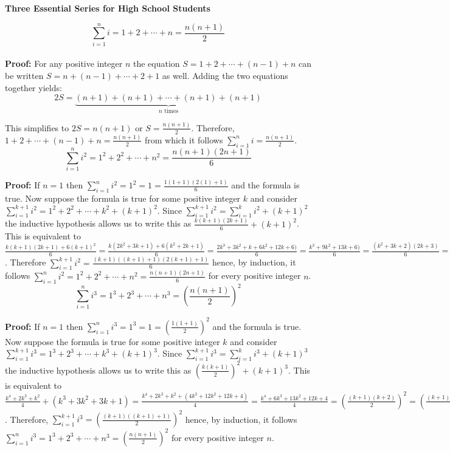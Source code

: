 \documentclass[12pt]{article}
\begin{document}
\begin{center}
\textbf{{\Large Three Essential Series for High School Students}}
\end{center}
\[\sum_{i=1}^{n}i=1+2+\cdots+n=\frac{n(n+1)}{2}\]\\
\textbf{Proof:} For any positive integer $n$ the equation $S=1+2+ \cdots +(n-1)+n$ can be written 
$S=n+(n-1)+\cdots+2+1$ as well. Adding the two equations together yields:
\[2S=\underbrace{(n+1)+(n+1)+\cdots+(n+1)+(n+1)}_\text{$n$ times}\]

This simplifies to $2S=n(n+1)$ or $S=\frac{n(n+1)}{2}$. Therefore,
$1+2+\cdots+(n-1)+n=\frac{n(n+1)}{2}$ from which it
follows $\sum_{i=1}^{n}i=\frac{n(n+1)}{2}$.\\

\[\sum_{i=1}^{n}i^2=1^2+2^2+\cdots + n^2=
\frac{n(n+1)(2n+1)}{6}\]

\noindent\textbf{Proof:} If $n=1$ then $\sum_{i=1}^{n}i^2=1^2=1=\frac{1(1+1)(2(1)+1)}{6}$ and the formula
is true. Now suppose the formula is true for some positive
integer $k$ and consider $\sum_{i=1}^{k+1}i^2=1^2+2^2+\cdots + k^2+(k+1)^2$. Since $\sum_{i=1}^{k+1}i^2=
\sum_{i=1}^{k}i^2+(k+1)^2$ the inductive hypothesis 
allows us to write this as $\frac{k(k+1)(2k+1)}{6}+(k+1)^2$.
This is equivalent to $\frac{k(k+1)(2k+1)+6(k+1)^2}{6}=
\frac{k(2k^2+3k+1)+6(k^2+2k+1)}{6}=
\frac{2k^3+3k^2+k+6k^2+12k+6)}{6}=
\frac{k^3+9k^2+13k+6)}{6} = 
\frac{(k^2+3k+2)(2k+3)}{6}=
\frac{(k+1)(k+2)(2(k+1)+1)}{6}$. Therefore $\sum_{i=1}^{k+1}i^2=\frac{(k+1)((k+1)+1)(2(k+1)+1)}{6}$
hence, by induction, it
follows $\sum_{i=1}^{n}i^2=1^2+2^2+
\cdots + n^2=\frac{n(n+1)(2n+1)}{6}$ for every 
positive integer $n$.\\

\[\sum_{i=1}^{n}i^3=1^3+2^3+\cdots + n^3=
\left(\frac{n(n+1)}{2}\right)^2\]

\noindent\textbf{Proof:} If $n=1$ then $\sum_{i=1}^{n}i^3=1^3=1=\left(\frac{1(1+1)}{2}\right)^2$ and 
the formula is true. Now suppose the formula is true for some 
positive integer $k$ and consider $\sum_{i=1}^{k+1}i^3=1^3+2^3+\cdots + k^3+(k+1)^3$. Since 
$\sum_{i=1}^{k+1}i^3=\sum_{i=1}^{k}i^3+(k+1)^3$
the inductive hypothesis allows us to write this as 
$\left(\frac{k(k+1)}{2}\right)^2+(k+1)^3$.
This is equivalent to $\frac{k^4+2k^3+k^2}{4}
+(k^3+3k^2+3k+1)=
\frac{k^4+2k^3+k^2+(4k^3+12k^2+12k+4)}{4}=
\frac{k^4+6k^3+13k^2+12k+4}{4}=
\left(\frac{(k+1)(k+2)}{2}\right)^2=
\left(\frac{(k+1)((k+1)+1)}{2}\right)^2$. Therefore,
$\sum_{i=1}^{k+1}i^3=\left(\frac{(k+1)((k+1)+1)}{2}\right)^2$ hence, by induction, it follows 
$\sum_{i=1}^{n}i^3=1^3+2^3+\cdots + n^3=
\left(\frac{n(n+1)}{2}\right)^2$ for every positive integer
$n$.
\end{document}
